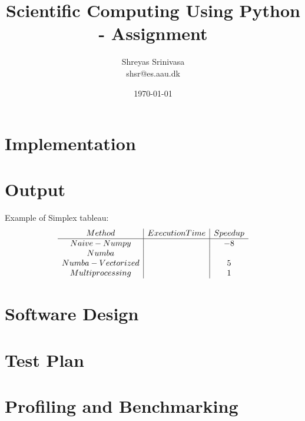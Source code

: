 \documentclass{article}
\title{Scientific Computing Using Python - Assignment}
\author{Shreyas Srinivasa \\ shsr@es.aau.dk}
\date{\today}
\begin{document}
\maketitle

\section{Implementation}

\section{Output}

Example of Simplex tableau:
\begin{align}
    \begin{array}{c | c | c}
         Method  & Execution Time & Speedup \\ 
         \hline %
         Naive-Numpy   &  & -8 \\
         Numba      &  &    \\
         Numba - Vectorized &  & 5 \\
         Multiprocessing &  & 1 \\
    \end{array}
\end{align}

\section{Software Design}

\section{Test Plan}


\section{Profiling and Benchmarking}
\end{document}
